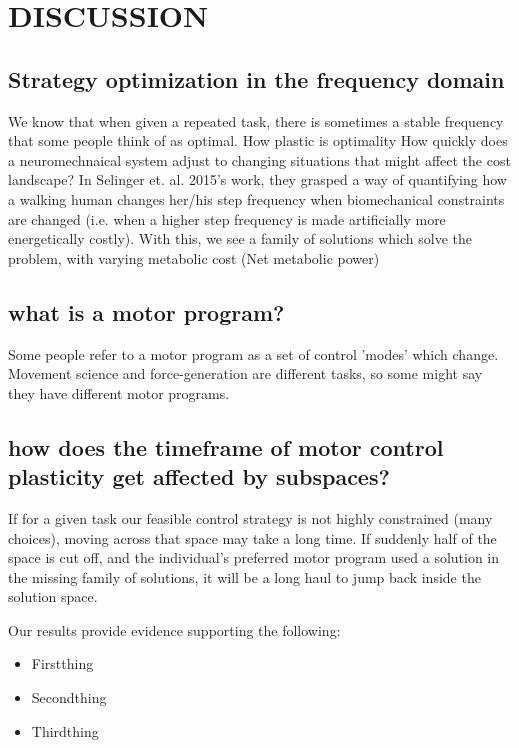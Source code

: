 \section{DISCUSSION}
\subsection{Strategy optimization in the frequency domain}
We know that when given a repeated task, there is sometimes a stable frequency that some people think of as optimal. How plastic is optimality
How quickly does a neuromechnaical system adjust to changing situations that might affect the cost landscape?
In Selinger et. al. 2015's work, they grasped a way of quantifying how a walking human changes her/his step frequency when biomechanical constraints are changed (i.e. when a higher step frequency is made artificially more energetically costly).
With this, we see a family of solutions which solve the problem, with varying metabolic cost (Net metabolic power)

\subsection{what is a motor program?}
Some people refer to a motor program as a set of control 'modes' which change.
Movement science and force-generation are different tasks, so some might say they have different motor programs.

\subsection{how does the timeframe of motor control plasticity get affected by subspaces?}
If for a given task our feasible control strategy is not highly constrained (many choices), moving across that space may take a long time.
If suddenly half of the space is cut off, and the individual's preferred motor program used a solution in the missing family of solutions, it will be a long haul to jump back inside the solution space.

Our results provide evidence supporting the following:
\begin{itemize}
	\item{Firstthing}
	\item{Secondthing}
	\item{Thirdthing}
\end{itemize}
